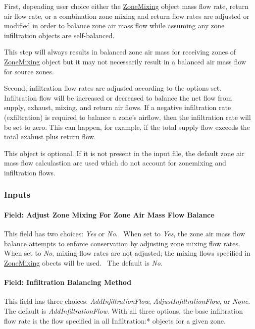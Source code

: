 First, depending user choice either the \hyperref[zonemixing]{ZoneMixing} object mass flow rate, return air flow rate, or a combination zone mixing and return flow rates are adjusted or modified in order to balance zone air mass flow while assuming any zone infiltration objects are self-balanced. 

This step will always results in balanced zone air mass for receiving zones of \hyperref[zonemixing]{ZoneMixing} object but it may not necessarily result in a balanced air mass flow for source zones.~

Second, infiltration flow rates are adjusted according to the options set. Infiltration flow will be increased or decreased to balance the net flow from supply, exhaust, mixing, and return air flows. If a negative infiltration rate (exfiltration) is required to balance a zone's airflow, then the infiltration rate will be set to zero. This can happen, for example, if the total supply flow exceeds the total exahust plus return flow.

This object is optional. If it is not present in the input file, the default zone air mass flow calculastion are used which do not account for zonemixing and infiltration flows.

\subsubsection{Inputs}\label{inputs-9-002}

\paragraph{Field: Adjust Zone Mixing For Zone Air Mass Flow Balance}\label{field-adjust-zone-mixing-for-zone-air-mass-flow-balance}

This field has two choices: \emph{Yes} or \emph{No}.~ When set to \emph{Yes}, the zone air mass flow balance attempts to enforce conservation by adjusting zone mixing flow rates. When set to \emph{No}, mixing flow rates are not adjusted; the mixing flows specified in \hyperref[zonemixing]{ZoneMixing} obects will be used.~ The default is \emph{No}.

\paragraph{Field: Infiltration Balancing Method}\label{field-infiltration-balancing-method}

This field has three choices: \emph{AddInfiltrationFlow}, \emph{AdjustInfiltrationFlow}, or \emph{None}. The default is \emph{AddInfiltrationFlow}. With all three options, the base infiltration flow rate is the flow specified in all Infiltration:* objects for a given zone.

